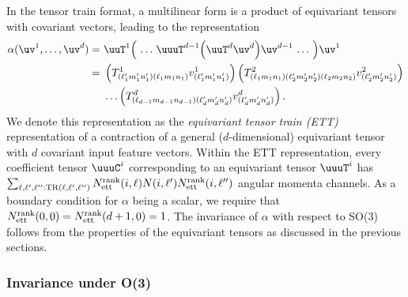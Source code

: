 In the tensor train format, a multilinear form is a product of equivariant tensors with covariant vectors, leading to the representation
\begin{equation}\label{eq:ETT}
\begin{aligned}
    \alpha(\uv^1, \ldots, \uv^d)
    =&\,\, \uuT^1 \Big( \,\ldots\, \uuuT^{d-1} \Big( \uuT^d \uv^d \Big) \uv^{d-1} \,\ldots\, \Big) \uv^1 \\
    =&\,\, \left(T^1_{(\ell_1' m_1' n_1') (\ell_1 m_1 n_1)} v^1_{(\ell_1' m_1' n_1')}\right)
           \left(T^2_{(\ell_1 m_1 n_1) (\ell_2' m_2' n_2') (\ell_2 m_2 n_2)} v^2_{(\ell_2' m_2' n_2')}\right) \\
     &\,\, \ldots
           \left(T^d_{(\ell_{d-1} m_{d-1} n_{d-1}) (\ell_d' m_d' n_d')} v^d_{(\ell_d' m_d' n_d')}\right).
\end{aligned}
\end{equation}
We denote this representation as the \emph{equivariant tensor train (ETT)} representation of a contraction of a general ($d$-dimensional) equivariant tensor with $d$ covariant input feature vectors.
Within the ETT representation, every coefficient tensor $\uuuC^i$ corresponding to an equivariant tensor $\uuuT^i$ has
$
\sum_{\ell,\ell',\ell'':{\rm TR}(\ell,\ell',\ell'')} N_{\rm ett}^{\rm rank}(i,\ell) N(i,\ell') N_{\rm ett}^{\rm rank}(i,\ell'')
$
angular momenta channels.
As a boundary condition for $\alpha$ being a scalar, we require that $N_{\rm ett}^{\rm rank}(0,0) = N_{\rm ett}^{\rm rank}(d+1,0) = 1$.
The invariance of $\alpha$ with respect to SO(3) follows from the properties of the equivariant tensors as discussed in the previous sections.

\subsubsection{Invariance under O(3)}
\label{sec:O(3)-invariance}

